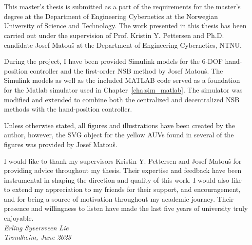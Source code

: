 \chapter*{\englishprefacename}
\vspace{-5mm}
This master’s thesis is submitted as a part of the requirements for the master's
degree at the Department of Engineering Cybernetics at the Norwegian University
of Science and Technology. The work presented in this thesis has been carried out under the supervision of
Prof. Kristin Y. Pettersen and Ph.D. candidate Josef Matou\v{s} at the Department of Engineering Cybernetics, NTNU.


During the project, I have been provided Simulink models for the 6-DOF hand-position controller and the first-order NSB method by Josef Matou\v{s}. The Simulink models as well as the included MATLAB code served as a foundation for the Matlab simulator used in Chapter~\ref{cha:sim_matlab}. The simulator was modified and extended to combine both the centralized and decentralized NSB methods with the hand-position controller.

Unless otherwise stated, all figures and illustrations have been created by the author, however, the SVG object for the yellow AUVs found in several of the figures was provided by Josef Matou\v{s}.

I would like to thank my supervisors Kristin Y. Pettersen and Josef Matou\v{s} for providing advice throughout my thesis. Their expertise and feedback have been instrumental in shaping the direction and quality of this work. I would also like to extend my appreciation to my friends for their support, and encouragement, and for being a source of motivation throughout my academic journey. Their presence and willingness to listen have made the last five years of university truly enjoyable.\\[.5cm]


\hfill {\it Erling Syversveen Lie}\\[-6mm]

\hfill {\it Trondheim, June 2023}\enlargethispage*{\baselineskip}
%
\clearpage
